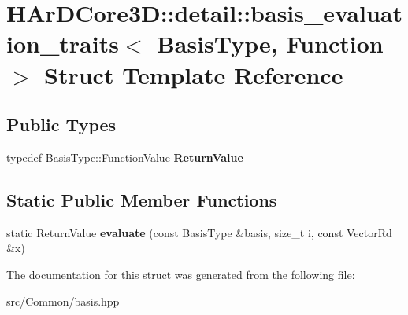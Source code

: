 \hypertarget{structHArDCore3D_1_1detail_1_1basis__evaluation__traits_3_01BasisType_00_01Function_01_4}{}\section{H\+Ar\+D\+Core3D\+:\+:detail\+:\+:basis\+\_\+evaluation\+\_\+traits$<$ Basis\+Type, Function $>$ Struct Template Reference}
\label{structHArDCore3D_1_1detail_1_1basis__evaluation__traits_3_01BasisType_00_01Function_01_4}
\subsection*{Public Types}
\begin{DoxyCompactItemize}
\item 
\mbox{\label{structHArDCore3D_1_1detail_1_1basis__evaluation__traits_3_01BasisType_00_01Function_01_4_adb3235548ad3a366c5f950e8bbf86083}} 
typedef Basis\+Type\+::\+Function\+Value {\bfseries Return\+Value}
\end{DoxyCompactItemize}
\subsection*{Static Public Member Functions}
\begin{DoxyCompactItemize}
\item 
\mbox{\label{structHArDCore3D_1_1detail_1_1basis__evaluation__traits_3_01BasisType_00_01Function_01_4_af68cac75a57525a28bebf726e03d4037}} 
static Return\+Value {\bfseries evaluate} (const Basis\+Type \&basis, size\+\_\+t i, const Vector\+Rd \&x)
\end{DoxyCompactItemize}


The documentation for this struct was generated from the following file\+:\begin{DoxyCompactItemize}
\item 
src/\+Common/basis.\+hpp\end{DoxyCompactItemize}
